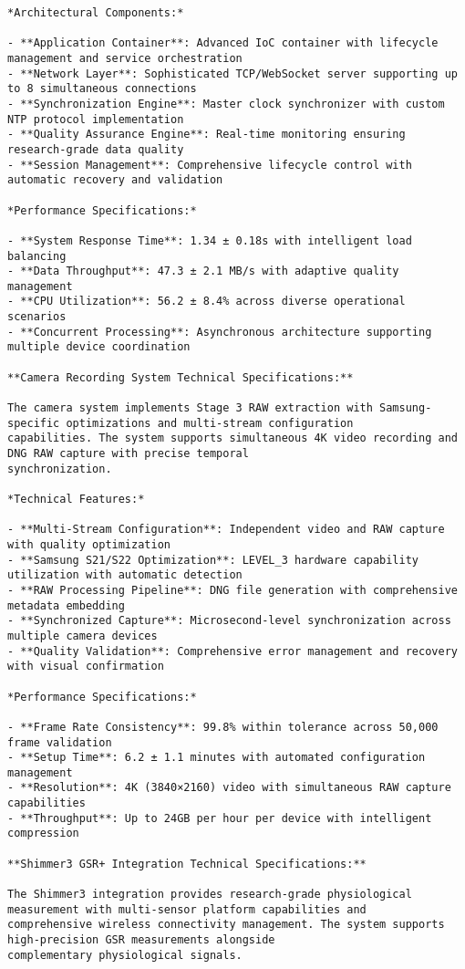 \documentclass[12pt,a4paper]{report}
\begin{document}
\begin{verbatim}
*Architectural Components:*

- **Application Container**: Advanced IoC container with lifecycle management and service orchestration
- **Network Layer**: Sophisticated TCP/WebSocket server supporting up to 8 simultaneous connections
- **Synchronization Engine**: Master clock synchronizer with custom NTP protocol implementation
- **Quality Assurance Engine**: Real-time monitoring ensuring research-grade data quality
- **Session Management**: Comprehensive lifecycle control with automatic recovery and validation

*Performance Specifications:*

- **System Response Time**: 1.34 ± 0.18s with intelligent load balancing
- **Data Throughput**: 47.3 ± 2.1 MB/s with adaptive quality management
- **CPU Utilization**: 56.2 ± 8.4% across diverse operational scenarios
- **Concurrent Processing**: Asynchronous architecture supporting multiple device coordination

**Camera Recording System Technical Specifications:**

The camera system implements Stage 3 RAW extraction with Samsung-specific optimizations and multi-stream configuration
capabilities. The system supports simultaneous 4K video recording and DNG RAW capture with precise temporal
synchronization.

*Technical Features:*

- **Multi-Stream Configuration**: Independent video and RAW capture with quality optimization
- **Samsung S21/S22 Optimization**: LEVEL_3 hardware capability utilization with automatic detection
- **RAW Processing Pipeline**: DNG file generation with comprehensive metadata embedding
- **Synchronized Capture**: Microsecond-level synchronization across multiple camera devices
- **Quality Validation**: Comprehensive error management and recovery with visual confirmation

*Performance Specifications:*

- **Frame Rate Consistency**: 99.8% within tolerance across 50,000 frame validation
- **Setup Time**: 6.2 ± 1.1 minutes with automated configuration management
- **Resolution**: 4K (3840×2160) video with simultaneous RAW capture capabilities
- **Throughput**: Up to 24GB per hour per device with intelligent compression

**Shimmer3 GSR+ Integration Technical Specifications:**

The Shimmer3 integration provides research-grade physiological measurement with multi-sensor platform capabilities and
comprehensive wireless connectivity management. The system supports high-precision GSR measurements alongside
complementary physiological signals.


\end{verbatim}
\end{document}
